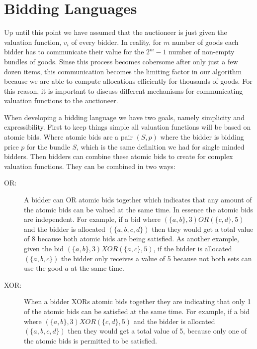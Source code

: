 \documentclass[10pt,onecolumn,letterpaper]{article}
\theoremstyle{definition}
\begin{document}
\section{Bidding Languages} %

Up until this point we have assumed that the auctioneer is just given the valuation function, $v_i$ of every bidder. In reality, for $m$ number of goods each bidder has to communicate their value for the $2^m - 1$ number of non-empty bundles of goods. Sinse this process becomes cobersome after only just a few dozen items, this communication becomes the limiting factor in our algorithm because we are able to compute allocations efficiently for thousands of goods. For this reason, it is important to discuss different mechanisms for communicating valuation functions to the auctioneer. 

When developing a bidding language we have two goals, namely simplicity and expressibility. First to keep things simple all valuation functions will be based on atomic bids. Where atomic bids are a pair $(S,p)$ where the bidder is bidding price $p$ for the bundle $S$, which is the same definition we had for single minded bidders. Then bidders can combine these atomic bids to create for complex valuation functions. They can be combined in two ways:

\begin{description}
  \item [OR:] A bidder can OR atomic bids together which indicates that any amount of the atomic bids can be valued at the same time. In essence the atomic bids are independent. For example, if a bid where $(\{a,b\}, 3) OR (\{c,d\}, 5)$ and the bidder is allocated $(\{a,b,c,d\})$ then they would get a total value of 8 because both atomic bids are being satisfied. As another example, given the bid $(\{a,b\}, 3) XOR (\{a,c\}, 5)$, if the bidder is allocated $(\{a,b,c\})$ the bidder only receives a value of 5 because not both sets can use the good $a$ at the same time. 

  \item [XOR:] When a bidder XORs atomic bids together they are indicating that only 1 of the atomic bids can be satisfied at the same time. For example, if a bid where $(\{a,b\}, 3) XOR (\{c,d\}, 5)$ and the bidder is allocated $(\{a,b,c,d\})$ then they would get a total value of 5, because only one of the atomic bids is permitted to be satisfied. 

\end{description}
\end{document}
